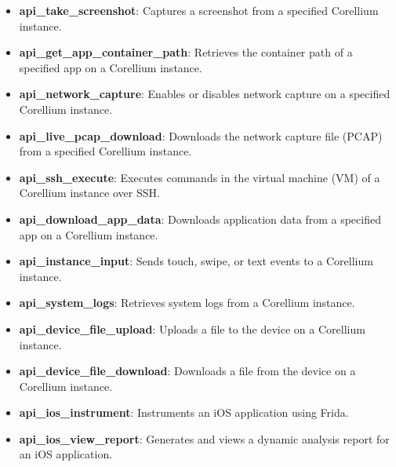 \documentclass{report}
\begin{document}
\begin{itemize}
\begin{itemize}
\begin{itemize}
\begin{itemize}
                    \item \textbf{api\_take\_screenshot}: Captures a screenshot from a specified Corellium instance.
                    
                    \item \textbf{api\_get\_app\_container\_path}: Retrieves the container path of a specified app on a Corellium instance.
                    
                    \item \textbf{api\_network\_capture}: Enables or disables network capture on a specified Corellium instance.
                    
                    \item \textbf{api\_live\_pcap\_download}: Downloads the network capture file (PCAP) from a specified Corellium instance.
                    
                    \item \textbf{api\_ssh\_execute}: Executes commands in the virtual machine (VM) of a Corellium instance over SSH.
                    
                    \item \textbf{api\_download\_app\_data}: Downloads application data from a specified app on a Corellium instance.
                    
                    \item \textbf{api\_instance\_input}: Sends touch, swipe, or text events to a Corellium instance.
                    
                    \item \textbf{api\_system\_logs}: Retrieves system logs from a Corellium instance.
                    
                    \item \textbf{api\_device\_file\_upload}: Uploads a file to the device on a Corellium instance.
                    
                    \item \textbf{api\_device\_file\_download}: Downloads a file from the device on a Corellium instance.
                    
                    \item \textbf{api\_ios\_instrument}: Instruments an iOS application using Frida.
                    
                    \item \textbf{api\_ios\_view\_report}: Generates and views a dynamic analysis report for an iOS application.
                    \end{itemize}


\end{itemize}
\end{itemize}
\end{itemize}
\end{document}
